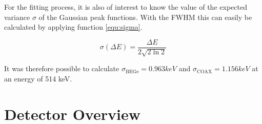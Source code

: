For the fitting process, it is also of interest to know the value of the expected variance $\sigma$ of the Gaussian peak functions.
With the FWHM this can easily be calculated by applying function \ref{equ:sigma}.

\begin{equation}
\sigma (\Delta E) = \frac{\Delta E}{2\sqrt{2\ln2}}
\label{equ:sigma}
\end{equation}

It was therefore possible to calculate $\sigma_{\mathrm{BEGe}} = 0.963 \unit{keV}$ and $\sigma_{\mathrm{COAX}} = 1.156 \unit{keV}$ at an energy of 514 keV.


\chapter{Detector Overview}

